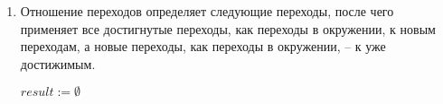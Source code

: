\begin{enumerate}
\begin{proof}
Теперь предположим, что $e \sqsubseteq e' \in E, R \subseteq E$
\begin{align*}
& \conctm{R \cup \{e\}} = \\
& \bigcup_{k}{
\bigcup_{
\begin{array}{c}
e_0, \dots,e_k \in R \cup \{e\} \\
t_0, \dots,t_k \in T
\end{array}
}{ 
\epp_I
\left(
\begin{pmatrix}
e_0 \\
t_0 
\end{pmatrix},
\left\{
\begin{pmatrix}
e_1 \\
t_1 
\end{pmatrix},
\dots ,
\begin{pmatrix}
e_k \\
t_k 
\end{pmatrix}
\right\}
\right)
}
} \subseteq \\
& \subseteq (req.~\ref{cpa_tm_epp_req_1},~\ref{cpa_tm_epp_req_2}) \subseteq \\
& \subseteq \bigcup_{k}{
\bigcup_{
\begin{array}{c}
e_0, \dots,e_k \in R \cup \{e'\} \\
t_0, \dots,t_k \in T
\end{array}
}{ 
\epp_I
\left(
\begin{pmatrix}
e_0 \\
t_0 
\end{pmatrix},
\left\{
\begin{pmatrix}
e_1 \\
t_1 
\end{pmatrix},
\dots ,
\begin{pmatrix}
e_k \\
t_k 
\end{pmatrix}
\right\}
\right)
}
} = \\
& = \conctm{R \cup \{e'\}}
\end{align*}
\end{proof}

\item Отношение переходов определяет следующие переходы, после чего применяет все достигнутые переходы, как переходы в окружении, к новым переходам, а новые переходы, как переходы в окружении, -- к уже достижимым.

\begin{algorithm}
 $result := \emptyset$ \;
 

\end{algorithm}
\end{enumerate}
